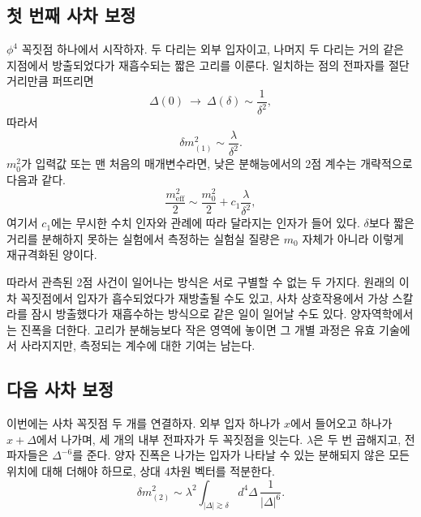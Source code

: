\subsection{첫 번째 사차 보정}

\(\phi^4\) 꼭짓점 하나에서 시작하자. 두 다리는 외부 입자이고, 나머지 두 다리는 거의 같은 지점에서 방출되었다가 재흡수되는 짧은 고리를 이룬다. 일치하는 점의 전파자를 절단 거리만큼 퍼뜨리면
\begin{equation}
\Delta(0)\ \longrightarrow\ \Delta(\delta)\sim\frac{1}{\delta^2},
\end{equation}
따라서
\begin{equation}
\delta m^2_{(1)}\sim\frac{\lambda}{\delta^2}.
\label{eq:one-loop-scalar-mass}
\end{equation}
\(m_0^2\)가 입력값 또는 맨 처음의 매개변수라면, 낮은 분해능에서의 2점 계수는 개략적으로 다음과 같다.
\begin{equation}
\frac{m_{\mathrm{eff}}^2}{2}
\sim
\frac{m_0^2}{2}
+c_1\frac{\lambda}{\delta^2},
\label{eq:first-renormalized-mass}
\end{equation}
여기서 \(c_1\)에는 무시한 수치 인자와 관례에 따라 달라지는 인자가 들어 있다. \(\delta\)보다 짧은 거리를 분해하지 못하는 실험에서 측정하는 실험실 질량은 \(m_0\) 자체가 아니라 이렇게 재규격화된 양이다.

따라서 관측된 2점 사건이 일어나는 방식은 서로 구별할 수 없는 두 가지다. 원래의 이차 꼭짓점에서 입자가 흡수되었다가 재방출될 수도 있고, 사차 상호작용에서 가상 스칼라를 잠시 방출했다가 재흡수하는 방식으로 같은 일이 일어날 수도 있다. 양자역학에서는 진폭을 더한다. 고리가 분해능보다 작은 영역에 놓이면 그 개별 과정은 유효 기술에서 사라지지만, 측정되는 계수에 대한 기여는 남는다.

\subsection{다음 사차 보정}

이번에는 사차 꼭짓점 두 개를 연결하자. 외부 입자 하나가 \(x\)에서 들어오고 하나가 \(x+\Delta\)에서 나가며, 세 개의 내부 전파자가 두 꼭짓점을 잇는다. \(\lambda\)은 두 번 곱해지고, 전파자들은 \(\Delta^{-6}\)를 준다. 양자 진폭은 나가는 입자가 나타날 수 있는 분해되지 않은 모든 위치에 대해 더해야 하므로, 상대 4차원 벡터를 적분한다.
\begin{equation}
\delta m^2_{(2)}
\sim
\lambda^2
\int_{|\Delta|\gtrsim\delta}
d^4\Delta\,\frac{1}{|\Delta|^6}.
\label{eq:two-loop-power-count}
\end{equation}

